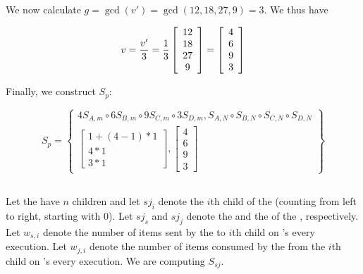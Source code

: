 We now calculate $g = \gcd(v') = \gcd(12,18,27,9) = 3$.  We thus
have

\begin{displaymath}
v = {v' \over 3} = {1 \over 3} \left[
\begin{array}{c}
12\\ 18\\ 27\\ 9
\end{array}
\right] = \left[
\begin{array}{c}
4\\ 6\\ 9\\ 3
\end{array}
\right]
\end{displaymath}

Finally, we construct $S_p$:

\begin{displaymath}
S_p = \left\{
\begin{array}{c}
4 S_{A,m} \circ 6 S_{B,m} \circ 9 S_{C,m} \circ 3
S_{D,m}, S_{A,N} \circ S_{B,N} \circ S_{C,N} \circ S_{D,N} \\
\left[
\begin{array}{c}
1 + (4-1) * 1 \\
4 * 1 \\
3 * 1
\end{array}\right],
\left[ \begin{array}{c} 4\\ 6\\ 9\\ 3 \end{array} \right]
\end{array}
\right\}
\end{displaymath}

\subsection{\splitjoin}

Let the {\splitjoin} have $n$ children and let $sj_i$ denote the
$i$th child of the {\splitjoin} (counting from left to right,
starting with 0).  Let $sj_s$ and $sj_j$ denote the {\splitter}
and the {\joiner} of the {\splitjoin}, respectively. Let $w_{s,i}$
denote the number of items sent by the {\splitter} to $i$th child
on {\splitter}'s every execution. Let $w_{j,i}$ denote the number
of items consumed by the {\joiner} from the $i$th child on
{\joiner}'s every execution.  We are computing $S_{sj}$.

